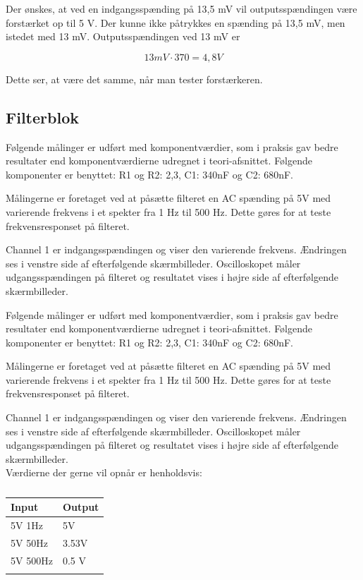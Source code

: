 Der ønskes, at ved en indgangsspænding på 13,5 mV vil outputsspændingen være forstærket op til 5 V. Der kunne ikke påtrykkes en spænding på 13,5 mV, men istedet med 13 mV. Outputsspændingen ved 13 mV er 

\begin{equation}
	13 mV \cdot 370 = 4,8 V
\end{equation} 

Dette ser, at være det samme, når man tester forstærkeren. 




\subsection{Filterblok}

Følgende målinger er udført med komponentværdier, som i praksis gav bedre resultater end komponentværdierne udregnet i teori-afsnittet. Følgende komponenter er benyttet: 
R1 og R2: 2,3, C1: 340nF og C2: 680nF. 

Målingerne er foretaget ved at påsætte filteret en AC spænding på 5V med varierende frekvens i et spekter fra 1 Hz til 500 Hz. Dette gøres for at teste frekvensresponset på filteret. 

Channel 1 er indgangsspændingen og viser den varierende frekvens. Ændringen ses i venstre side af efterfølgende skærmbilleder. 
Oscilloskopet måler udgangsspændingen på filteret og resultatet vises i højre side af efterfølgende skærmbilleder. 

Følgende målinger er udført med komponentværdier, som i praksis gav bedre resultater end komponentværdierne udregnet i teori-afsnittet. Følgende komponenter er benyttet: 
R1 og R2: 2,3, C1: 340nF og C2: 680nF. 

Målingerne er foretaget ved at påsætte filteret en AC spænding på 5V med varierende frekvens i et spekter fra 1 Hz til 500 Hz. Dette gøres for at teste frekvensresponset på filteret. 

Channel 1 er indgangsspændingen og viser den varierende frekvens. Ændringen ses i venstre side af efterfølgende skærmbilleder. 
Oscilloskopet måler udgangsspændingen på filteret og resultatet vises i højre side af efterfølgende skærmbilleder. \\
Værdierne der gerne vil opnår er henholdsvis:


\begin{longtabu} to 
	\textbf{Input} & \textbf{Output} \\[-1ex]
	\midrule
	5V 1Hz & 5V \\[-1ex]
	5V 50Hz	& 3.53V\\[-1ex]
	5V 500Hz & 0.5 V \\[-1ex]
	\caption{}	
\end{longtabu}

